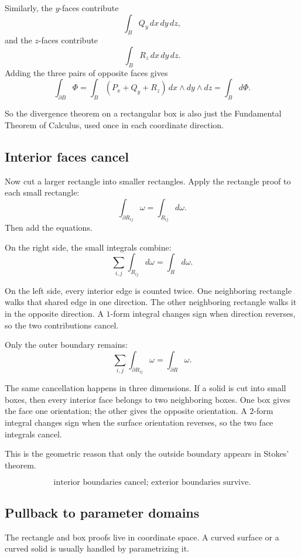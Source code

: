 Similarly, the \(y\)-faces contribute
\[
    \int_B Q_y\,dx\,dy\,dz,
\]
and the \(z\)-faces contribute
\[
    \int_B R_z\,dx\,dy\,dz.
\]
Adding the three pairs of opposite faces gives
\[
\boxed{
    \int_{\partial B}\Phi
    =
    \int_B (P_x+Q_y+R_z)\,dx\wedge dy\wedge dz
    =
    \int_B d\Phi.
}
\]

So the divergence theorem on a rectangular box is also just the Fundamental Theorem
of Calculus, used once in each coordinate direction.

\subsection{Interior faces cancel}

Now cut a larger rectangle into smaller rectangles.  Apply the rectangle proof to each
small rectangle:
\[
    \int_{\partial R_{ij}}\omega=\int_{R_{ij}}d\omega.
\]
Then add the equations.

On the right side, the small integrals combine:
\[
    \sum_{i,j}\int_{R_{ij}}d\omega=\int_R d\omega.
\]

On the left side, every interior edge is counted twice.  One neighboring rectangle walks
that shared edge in one direction.  The other neighboring rectangle walks it in the
opposite direction.  A \(1\)-form integral changes sign when direction reverses, so the
two contributions cancel.

Only the outer boundary remains:
\[
    \sum_{i,j}\int_{\partial R_{ij}}\omega
    =
    \int_{\partial R}\omega.
\]


The same cancellation happens in three dimensions.  If a solid is cut into small boxes,
then every interior face belongs to two neighboring boxes.  One box gives the face one
orientation; the other gives the opposite orientation.  A \(2\)-form integral changes sign
when the surface orientation reverses, so the two face integrals cancel.

This is the geometric reason that only the outside boundary appears in Stokes' theorem.

\[
\boxed{
    \text{interior boundaries cancel; exterior boundaries survive.}
}
\]

\subsection{Pullback to parameter domains}

The rectangle and box proofs live in coordinate space.  A curved surface or a curved
solid is usually handled by parametrizing it.

